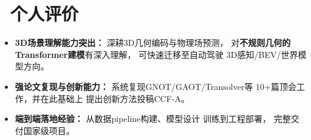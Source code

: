 \documentclass[11pt]{article}
\begin{document}
\section{\makebox[\widthof{\faUser}][c]
{\color{CVBlue}\faUser}\ 个人评价}

\begin{itemize}
    \item \textbf{3D场景理解能力突出：}
    深耕3D几何编码与物理场预测，
    对\textbf{不规则几何的
    Transformer建模}有深入理解，
    可快速迁移至自动驾驶
    3D感知/BEV/世界模型方向。
    
    \item \textbf{强论文复现与创新能力：}
    系统复现GNOT/GAOT/Transolver等
    10+篇顶会工作，并在此基础上
    提出创新方法投稿CCF-A。
    
    \item \textbf{端到端落地经验：}
    从数据pipeline构建、模型设计
    训练到工程部署，
    完整交付国家级项目。
\end{itemize}
\end{document}
